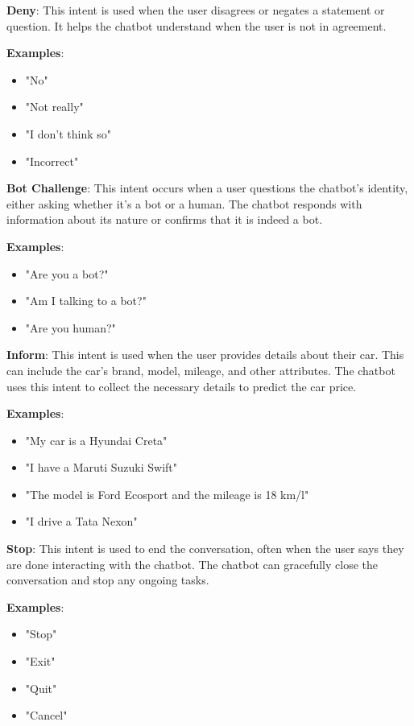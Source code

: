 \documentclass[a4paper,12pt]{article}
\begin{document}
\textbf{Deny}: This intent is used when the user disagrees or negates a statement or question. It helps the chatbot understand when the user is not in agreement.

\textbf{Examples}:
\begin{itemize}
    \item "No"
    \item "Not really"
    \item "I don't think so"
    \item "Incorrect"
\end{itemize}

\textbf{Bot Challenge}: This intent occurs when a user questions the chatbot’s identity, either asking whether it’s a bot or a human. The chatbot responds with information about its nature or confirms that it is indeed a bot.

\textbf{Examples}:
\begin{itemize}
    \item "Are you a bot?"
    \item "Am I talking to a bot?"
    \item "Are you human?"
\end{itemize}

\textbf{Inform}: This intent is used when the user provides details about their car. This can include the car’s brand, model, mileage, and other attributes. The chatbot uses this intent to collect the necessary details to predict the car price.

\textbf{Examples}:
\begin{itemize}
    \item "My car is a Hyundai Creta"
    \item "I have a Maruti Suzuki Swift"
    \item "The model is Ford Ecosport and the mileage is 18 km/l"
    \item "I drive a Tata Nexon"
\end{itemize}

\textbf{Stop}: This intent is used to end the conversation, often when the user says they are done interacting with the chatbot. The chatbot can gracefully close the conversation and stop any ongoing tasks.

\textbf{Examples}:
\begin{itemize}
    \item "Stop"
    \item "Exit"
    \item "Quit"
    \item "Cancel"
\end{itemize}
\end{document}
